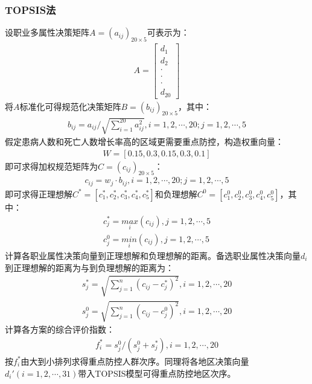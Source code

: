 \documentclass{whutmod}
\begin{document}
    \subsubsection{TOPSIS法}
    设职业多属性决策矩阵$A=(a_{ij})_{20 \times 5}$可表示为：
    \begin{gather}
    A= \begin{bmatrix}d_{1}
    \\ d_{2}
    \\ \cdot
    \\ \cdot
    \\ \cdot
    \\ d_{20}
    \end{bmatrix}
    \end{gather}
    将$A$标准化可得规范化决策矩阵$B=(b_{ij})_{20 \times 5}$，其中：
    \begin{gather}
    b_{ij}=a_{ij}/\sqrt{\sum_{i=1}^{20}a_{ij}^{2}},i=1,2,\cdots,20;j=1,2,\cdots,5
    \end{gather}
    假定患病人数和死亡人数增长率高的区域更需要重点防控，构造权重向量：
    \begin{gather}
    W=[0.15,0.3,0.15,0.3,0.1]
    \end{gather}
    即可求得加权规范矩阵为$C=(c_{ij})_{20 \times 5}$：
    \begin{gather}
    c_{ij}=w_{j} \cdot b_{ij} ,i=1,2,\cdots,20;j=1,2,\cdots,5
    \end{gather}
    即可求得正理想解$C^{*}=[c_{1}^{*},c_{2}^{*},c_{3}^{*},c_{4}^{*},c_{5}^{*}]$和负理想解$C^{0}=[c_{1}^{0},c_{2}^{0},c_{3}^{0},c_{4}^{0},c_{5}^{0}]$，其中：
    \begin{gather}
    c_{j}^{*}=\underset{i}{max}(c_{ij}) ,j=1,2,\cdots,5\\
    c_{j}^{0}=\underset{i}{min}(c_{ij}) ,j=1,2,\cdots,5
    \end{gather}
    计算各职业属性决策向量到正理想解和负理想解的距离。备选职业属性决策向量$d_{i}$到正理想解的距离为与到负理想解的距离为：
    \begin{gather}
    s_{j}^{*}=\sqrt{\sum_{j=1}^{n}(c_{ij}-c_{j}^*)^{2}},i=1,2,\cdots,20\\
    s_{j}^{0}=\sqrt{\sum_{j=1}^{n}(c_{ij}-c_{j}^{0})^{2}},i=1,2,\cdots,20
    \end{gather}
    计算各方案的综合评价指数：
    \begin{gather}
    f_{i}^{*}=s_{j}^{0}/(s_{j}^{0}+s_{j}^{*}),i=1,2,\cdots,20
    \end{gather}
    按$f_{i}^{*}$由大到小排列求得重点防控人群次序。同理将各地区决策向量$d_{i}'(i=1,2,\cdots,31)$带入TOPSIS模型可得重点防控地区次序。
\end{document}
